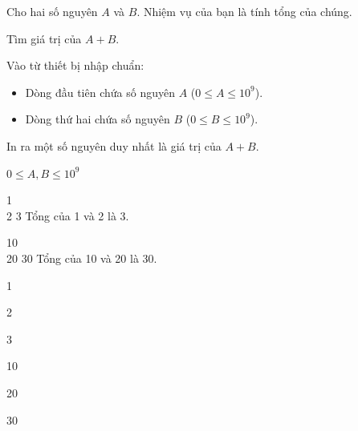 
Cho hai số nguyên $A$ và $B$. Nhiệm vụ của bạn là tính tổng của chúng.

Tìm giá trị của $A + B$.

Vào từ thiết bị nhập chuẩn:
\begin{itemize}
  \item Dòng đầu tiên chứa số nguyên $A$ ($0 \le A \le 10^9$).
  \item Dòng thứ hai chứa số nguyên $B$ ($0 \le B \le 10^9$).
\end{itemize}

In ra một số nguyên duy nhất là giá trị của $A + B$.

$0 \le A, B \le 10^9$


\begin{SampleTable}
\SampleRow
{1\\2}
{3}
{Tổng của 1 và 2 là 3.}

\SampleRow
{10\\20}
{30}
{Tổng của 10 và 20 là 30.}
\end{SampleTable}

\begin{SampleTableIO}
\SampleRowIO
{1

2}
{3}

\SampleRowIO
{10

20}
{30}
\end{SampleTableIO}